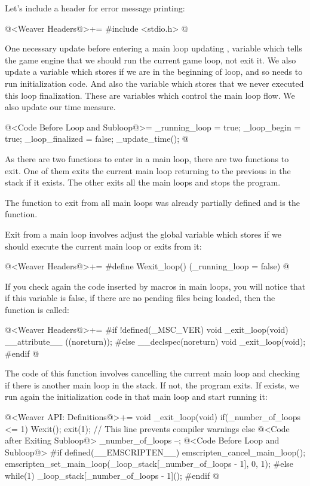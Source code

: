 Let's include a header for error message printing:

@<Weaver Headers@>+=
#include <stdio.h>
@

One necessary update before entering a main loop updating
, variable which tells the game engine
that we should run the current game loop, not exit it. We also update
a variable which stores if we are in the beginning of loop, and so
needs to run initialization code. And also the variable which stores
that we never executed this loop finalization. These are variables
which control the main loop flow. We also update our time measure.

\iniciocodigo
@<Code Before Loop and Subloop@>=
_running_loop = true;
_loop_begin = true;
_loop_finalized = false;
_update_time();
@
\fimcodigo


As there are two functions to enter in a main loop, there are two
functions to exit. One of them exits the current main loop returning
to the previous in the stack if it exists. The other exits all the
main loops and stops the program.

The function to exit from all main loops was already partially defined
and is the  function.

Exit from a main loop involves adjust the global variable which stores
if we should execute the current main loop or exits from it:

\iniciocodigo
@<Weaver Headers@>+=
#define Wexit_loop() (_running_loop = false)
@
\fimcodigo

If you check again the code inserted by macros in main loops, you will
notice that if this variable is false, if there are no pending files
being loaded, then the function  is called:

\iniciocodigo
@<Weaver Headers@>+=
#if !defined(_MSC_VER)
void _exit_loop(void) __attribute__ ((noreturn));
#else
__declspec(noreturn) void _exit_loop(void);
#endif
@
\fimcodigo

The code of this function involves cancelling the current main loop
and checking if there is another main loop in the stack. If not, the
program exits.  If exists, we run again the initialization code in
that main loop and start running it:

\iniciocodigo
@<Weaver API: Definitions@>+=
void _exit_loop(void){
  if(_number_of_loops <= 1){
    Wexit();
    exit(1); // This line prevents compiler warnings
  }
  else{
    @<Code after Exiting Subloop@>
    _number_of_loops --;
    @<Code Before Loop and Subloop@>
#if defined(__EMSCRIPTEN__)
    emscripten_cancel_main_loop();
    emscripten_set_main_loop(_loop_stack[_number_of_loops - 1], 0, 1);
#else
    while(1)
      _loop_stack[_number_of_loops - 1]();
#endif
  }
}
@
\fimcodigo

